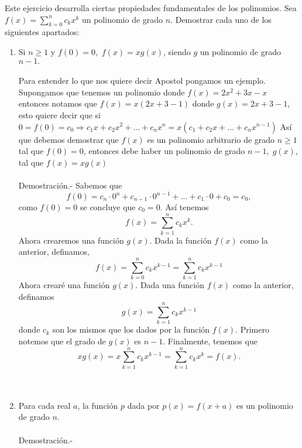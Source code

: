 \begin{teo}
Este ejercicio desarrolla ciertas propiedades fundamentales de los polinomios. Sea $f(x)=\displaystyle\sum_{k=0}^{n} c_k x^k$ un polinomio de grado $n$. Demostrar cada uno de los siguientes apartados:
\begin{enumerate}[\bfseries a)]
\item Si $n \geq 1$ \; y \; $f(0)=0,$ $f(x)=xg(x)$, siendo $g$ un polinomio de grado $n-1.$\\\\
Para entender lo que nos quiere decir Apostol pongamos un ejemplo. Supongamos que tenemos un polinomio donde $f(x)=2x^2+3x-x$ entonces notamos que $f(x)=x(2x+3-1)$ donde $g(x)=2x+3-1$, esto quiere decir que si $0 = f(0)=c_0 \Rightarrow c_1 x + c_2 x^2 + ... + c_n x^n = x(c_1 + c_2 x + ... + c_n x^{n-1})$ 
Así que debemos demostrar que $f(x)$ es un polinomio arbitrario de grado $n \geq 1$ tal que $f(0)=0$, entonces debe haber un polinomio de grado $n-1, \; g(x)$, tal que $f(x)=xg(x)$\\\\
Demostración.- \; Sabemos que $$f(0) = c_n \cdot 0^n + c_{n-1} \cdot 0^{n-1} + ... + c_1 \cdot 0 + c_0 =c_0,$$ como $f(0)=0$ se concluye que $c_0=0$. Así tenemos $$f(x)=\displaystyle\sum_{k=1}^{n} c_k x^k.$$ Ahora crearemos una función $g(x).$ Dada la función $f(x)$ como la anterior, definamos, $$f(x)=\displaystyle\sum_{k=0}^{n} c_k x^{k-1} = \sum_{k=1}^{n} c_k x^{k-1}$$ 
Ahora crearé una función $g(x)$. Dada una función $f(x)$ como la anterior, definamos  $$g(x) = \displaystyle\sum_{k=1}^{n} c_k x^{k-1}$$
donde $c_k$ son los mismos que los dados por la función $f(x)$. Primero notemos que el grado de $g(x)$ es $n-1$. Finalmente, tenemos que $$ xg(x) = x \displaystyle\sum_{k=1}^{n} c_k x^{k-1} = \sum_{k=1}^{n} c_k x^k = f(x).$$ \\\\

\item Para cada real $a$, la función $p$ dada por $p(x)=f(x+a)$ es un polinomio de grado $n.$\\\\
Demostración.- \; 
\end{enumerate}
\end{teo}